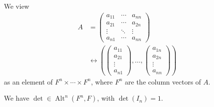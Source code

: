 \documentclass[10pt]{mypackage}
\begin{document}
    We view
    \begin{align*}
      A &= \begin{pmatrix}a_{11} & \cdots & a_{nn} \\ a_{21} & \cdots & a_{2n} \\ \vdots & \ddots & \vdots \\ a_{n1} & \cdots & a_{nn}\end{pmatrix}\\
        &\leftrightarrow \left( \begin{pmatrix}a_{11}\\a_{21}\\\vdots\\a_{n1}\end{pmatrix},\dots, \begin{pmatrix}a_{1n}\\a_{2n}\\\vdots\\a_{nn}\end{pmatrix}\right)
    \end{align*}
    as an element of $F^{n}\times\cdots \times F^{n}$, where $F^{n}$ are the column vectors of $A$.
    \begin{theorem}
      We have $\det\in \operatorname{Alt}^{n}\left(F^{n},F\right)$, with $\det\left(I_n\right) = 1$.
    \end{theorem}
\end{document}
